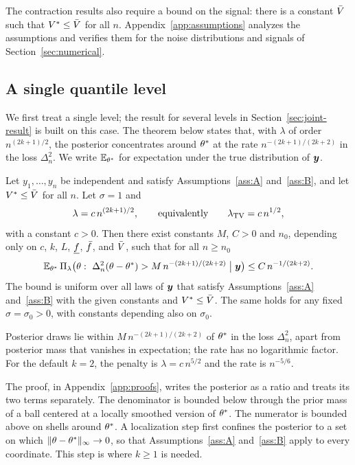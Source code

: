 The contraction results also require a bound on the signal: there is a constant $\bar V$ such that $V^{*}\le\bar V$ for all $n$. Appendix~\ref{app:assumptions} analyzes the assumptions and verifies them for the noise distributions and signals of Section~\ref{sec:numerical}.

\subsection{A single quantile level}\label{sec:main-result}

We first treat a single level; the result for several levels in Section~\ref{sec:joint-result} is built on this case. The theorem below states that, with $\lambda$ of order $n^{(2k+1)/2}$, the posterior concentrates around $\theta^{*}$ at the rate $n^{-(2k+1)/(2k+2)}$ in the loss $\Delta_n^2$. We write $\mathbb{E}_{\theta^{*}}$ for expectation under the true distribution of $\bm{y}$.

\begin{theorem}\label{thm:main}
Let $y_1,\dots,y_n$ be independent and satisfy Assumptions~\ref{ass:A} and~\ref{ass:B}, and let $V^{*}\le\bar V$ for all $n$. Let $\sigma=1$ and
\[
\lambda=c\,n^{(2k+1)/2},\qquad\text{equivalently}\qquad\lambda_{\mathrm{TV}}=c\,n^{1/2},
\]
with a constant $c>0$. Then there exist constants $M$, $C>0$ and $n_0$, depending only on $c$, $k$, $L$, $\underline f$, $\bar f$, and $\bar V$, such that for all $n\ge n_0$
\[
\E_{\thetas}\,\Pi_\lambda\bigl(\theta:\ \Delta_n^2(\theta-\thetas)>M\,n^{-(2k+1)/(2k+2)}\bigm|\by\bigr)\le C\,n^{-1/(2k+2)}.
\]
The bound is uniform over all laws of $\bm{y}$ that satisfy Assumptions~\ref{ass:A} and~\ref{ass:B} with the given constants and $V^{*}\le\bar V$. The same holds for any fixed $\sigma=\sigma_0>0$, with constants depending also on $\sigma_0$.
\end{theorem}

Posterior draws lie within $M\,n^{-(2k+1)/(2k+2)}$ of $\theta^{*}$ in the loss $\Delta_n^2$, apart from posterior mass that vanishes in expectation; the rate has no logarithmic factor. For the default $k=2$, the penalty is $\lambda=c\,n^{5/2}$ and the rate is $n^{-5/6}$.

The proof, in Appendix~\ref{app:proofs}, writes the posterior as a ratio and treats its two terms separately. The denominator is bounded below through the prior mass of a ball centered at a locally smoothed version of $\theta^{*}$. The numerator is bounded above on shells around $\theta^{*}$. A localization step first confines the posterior to a set on which $\|\theta-\theta^{*}\|_\infty\to0$, so that Assumptions~\ref{ass:A} and~\ref{ass:B} apply to every coordinate. This step is where $k\ge1$ is needed.

